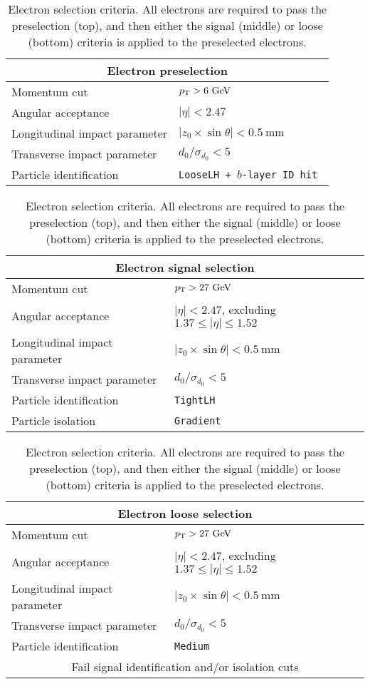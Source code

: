 \begin{table}[htbp]
  \centering
  \begin{tabular}{l l}
    \multicolumn{2}{c}{Electron preselection} \\ 
    \hline\hline
    Momentum cut                  & $p_{\mathrm{T}} > 6~\textrm{GeV}$ \\
    Angular acceptance            & $|\eta| < 2.47$ \\
    Longitudinal impact parameter & $|z_0\times\sin\theta| < 0.5~\textrm{mm}$ \\
    Transverse impact parameter   & $d_0/\sigma_{d_{0}} < 5$ \\
    Particle identification       & \tt{LooseLH} + $b$-layer ID hit \\
    \hline
  \end{tabular}

  \vspace{8mm}

  \begin{tabular}{l l}
    \multicolumn{2}{c}{Electron signal selection} \\ 
    \hline\hline
    Momentum cut                  & $p_{\mathrm{T}} > 27~\textrm{GeV}$ \\
    Angular acceptance            & $|\eta| < 2.47$, excluding $1.37 \le |\eta| \le 1.52$ \\
    Longitudinal impact parameter & $|z_0\times\sin\theta| < 0.5~\textrm{mm}$ \\
    Transverse impact parameter   & $d_0/\sigma_{d_{0}} < 5$ \\
    Particle identification       & \tt{TightLH} \\
    Particle isolation            & \tt{Gradient}\\
    \hline
  \end{tabular}

  \vspace{8mm}

  \begin{tabular}{l l}
    \multicolumn{2}{c}{Electron loose selection} \\ 
    \hline\hline
    Momentum cut                  & $p_{\mathrm{T}} > 27~\textrm{GeV}$ \\
    Angular acceptance            & $|\eta| < 2.47$, excluding $1.37 \le |\eta| \le 1.52$ \\
    Longitudinal impact parameter & $|z_0\times\sin\theta| < 0.5~\textrm{mm}$ \\
    Transverse impact parameter   & $d_0/\sigma_{d_{0}} < 5$ \\
    Particle identification       & \tt{Medium} \\
    \multicolumn{2}{c}{Fail signal identification and/or isolation cuts} \\
    \hline
  \end{tabular}
  \caption{Electron selection criteria.  All electrons are required to pass the preselection (top), and then either the signal (middle) or loose (bottom) criteria is applied to the preselected electrons.}
  \label{tab:ssww13tev_elec_selection}
\end{table}
